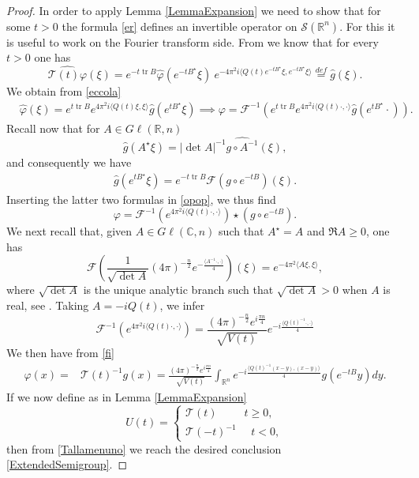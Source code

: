 \documentclass[11pt,letter]{amsart}
\def \phi {\varphi}
\def \R {\mathbb{R}}
\def \vf{\varphi}
\newcommand{\Rn}{\mathbb R^n}
\numberwithin{equation}{section}
\newcommand{\tr}{\operatorname{tr}}
\newcommand{\sa}{\langle}
\newcommand{\da}{\rangle}
\numberwithin{equation}{section}
\begin{document}
\begin{proof}
In order to apply Lemma \ref{LemmaExpansion} we need to show that for some $t>0$ the formula \eqref{er} defines an invertible operator on $\mathscr S(\Rn)$. For this it is useful to work on the Fourier transform side. From \cite[(2.15)]{GL} we know that for every $t>0$ one has
\begin{equation}\label{eccola}
\widehat{\mathcal T(t)\vf}(\xi) = e^{-t \tr B} \hat \vf(e^{-tB^\star}\xi) \  e^{-4\pi^2 i  \sa Q(t) e^{-tB^\star}\xi,e^{-tB^\star}\xi\da} \overset{def}{=} \hat{g}(\xi).
\end{equation}    
We obtain from \eqref{eccola}
\begin{align}\label{opop}
&\hat{\phi}(\xi)=e^{t \tr B}e^{4\pi^{2}i\langle Q(t)\xi,\xi\rangle}\hat{g}(e^{t B^{\star}}\xi)\implies\phi =\mathscr{F}^{-1}(e^{t \tr B}e^{4\pi^{2}i\langle Q(t)\cdot,\cdot\rangle}\hat{g}(e^{t B^{\star}}\cdot)).
\end{align}
Recall now that for $A\in G\ell(\R,n)$
\[
\hat{g}(A^{\star}\xi)=|\det A|^{-1}\widehat{g \circ A^{-1}}(\xi),
\]
and consequently we have
\begin{align*}
\hat{g}(e^{t B^{\star}}\xi)=e^{-t \tr B}\mathscr F(g\circ e^{-t B})(\xi).
\end{align*}
Inserting the latter two formulas in \eqref{opop}, we thus find
\begin{equation}\label{fi}
\vf = \mathscr{F}^{-1}\left(e^{4\pi^{2}i\langle Q(t)\cdot,\cdot\rangle}\right) \star (g\circ e^{-t B}).
\end{equation}
We next recall that, given $A\in G\ell(\mathbb C,n)$ such that $A^\star = A$ and $\Re A \ge 0$, one has 
\begin{equation}\label{gengaussi2}
\mathscr F\left(\frac{1}{\sqrt{\operatorname{det} A}}(4\pi
)^{-\frac{n}{2}} e^{- \frac{\sa A^{-1}\cdot,\cdot\da}{4}}\right)(\xi) =
e^{- 4 \pi^2  \sa A\xi,\xi\da},
\end{equation}
where $\sqrt{\operatorname{det} A}$ is the unique analytic branch such that $\sqrt{\operatorname{det} A}>0$ when $A$ is real, see \cite[Theor.7.6.1]{Hobook}.
Taking $A=- i Q(t)$, we infer
\[
\mathscr{F}^{-1}\left(e^{4\pi^{2}i\langle Q(t)\cdot,\cdot\rangle}\right) = \frac{(4\pi
)^{-\frac{n}{2}} e^{i\frac{\pi n}{4}}}{\sqrt{V(t)}} e^{- i\frac{\sa Q(t)^{-1}\cdot,\cdot\da}{4}} 
\]
We then have from \eqref{fi}
\begin{align}\label{Tallamenuno}
\vf(x) = & \mathcal T(t)^{-1} g(x) = \frac{(4\pi
)^{-\frac{n}{2}} e^{i\frac{\pi n}{4}}}{\sqrt{V(t)}} \int_{\Rn} e^{- i\frac{\sa Q(t)^{-1}(x-y),(x-y)\da}{4}} g(e^{-t B}y)dy.
\end{align}
If we now define as in Lemma \ref{LemmaExpansion}
\[
U(t) = \begin{cases}
\mathcal T(t)\ \ \ \ \ \ \ \ \ \ \ t\ge 0,
\\
\mathcal T(-t)^{-1}\ \ \ \ \ \ t< 0,
\end{cases}
\]
then from \eqref{Tallamenuno} we reach the desired conclusion \eqref{ExtendedSemigroup}.


\end{proof}
\end{document}
